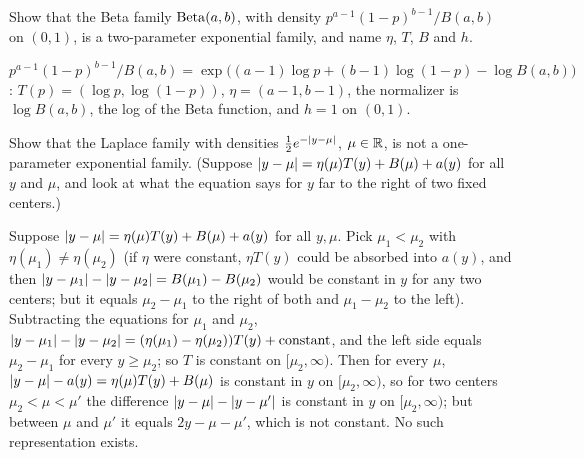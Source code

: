 \begin{exercise}
\label{ex:ef-beta}
Show that the Beta family $\mathrm{Beta}(a, b)$, with density $p^{a-1}(1 - p)^{b-1}/B(a, b)$ on $(0, 1)$, is a two-parameter exponential family, and name $\eta$, $T$, $B$ and $h$.
\end{exercise}
\begin{solution}
$p^{a-1}(1-p)^{b-1}/B(a, b) = \exp\big((a - 1)\log p + (b - 1)\log(1 - p) - \log B(a, b)\big)$: $T(p) = (\log p, \log(1 - p))$, $\eta = (a - 1, b - 1)$, the normalizer is $\log B(a, b)$, the log of the Beta function, and $h = 1$ on $(0, 1)$.
\end{solution}

\begin{exercise}
\label{ex:ef-laplace}
Show that the Laplace family with densities $\frac12e^{-\lvert y - \mu\rvert}$, $\mu \in \mathbb{R}$, is not a one-parameter exponential family. (Suppose $\lvert y - \mu\rvert = \eta(\mu)T(y) + B(\mu) + a(y)$ for all $y$ and $\mu$, and look at what the equation says for $y$ far to the right of two fixed centers.)
\end{exercise}
\begin{solution}
Suppose $\lvert y - \mu\rvert = \eta(\mu)T(y) + B(\mu) + a(y)$ for all $y, \mu$. Pick $\mu_1 < \mu_2$ with $\eta(\mu_1) \neq \eta(\mu_2)$ (if $\eta$ were constant, $\eta T(y)$ could be absorbed into $a(y)$, and then $\lvert y - \mu_1\rvert - \lvert y - \mu_2\rvert = B(\mu_1) - B(\mu_2)$ would be constant in $y$ for any two centers; but it equals $\mu_2 - \mu_1$ to the right of both and $\mu_1 - \mu_2$ to the left). Subtracting the equations for $\mu_1$ and $\mu_2$, $\lvert y - \mu_1\rvert - \lvert y - \mu_2\rvert = (\eta(\mu_1) - \eta(\mu_2))T(y) + \text{constant}$, and the left side equals $\mu_2 - \mu_1$ for every $y \geq \mu_2$; so $T$ is constant on $[\mu_2, \infty)$. Then for every $\mu$, $\lvert y - \mu\rvert - a(y) = \eta(\mu)T(y) + B(\mu)$ is constant in $y$ on $[\mu_2, \infty)$, so for two centers $\mu_2 < \mu < \mu'$ the difference $\lvert y - \mu\rvert - \lvert y - \mu'\rvert$ is constant in $y$ on $[\mu_2, \infty)$; but between $\mu$ and $\mu'$ it equals $2y - \mu - \mu'$, which is not constant. No such representation exists.
\end{solution}

